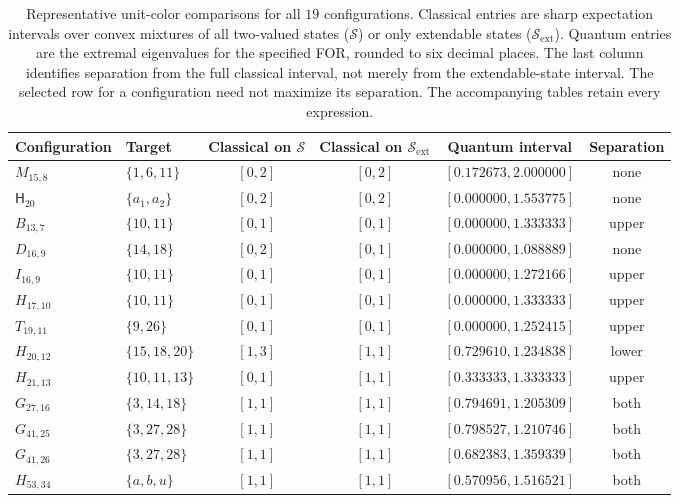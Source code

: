 \documentclass[aps,pra,reprint,superscriptaddress,longbibliography,nofootinbib,floatfix,10pt]{revtex4-2}
\theoremstyle{definition}\newtheorem{definition}[theorem]{Definition}
\theoremstyle{remark}\newtheorem{remark}[theorem]{Remark}
\newcommand{\Sc}{\mathcal S}\newcommand{\Cc}{\mathcal C}\newcommand{\Wc}{\mathcal W}
\begin{document}
\begin{table}[t]
\caption{Representative unit-color comparisons for all $19$ configurations. Classical entries are sharp expectation intervals over convex mixtures of all two-valued states ($\Sc$) or only extendable states ($\Sc_{\mathrm{ext}}$). Quantum entries are the extremal eigenvalues for the specified FOR, rounded to six decimal places. The last column identifies separation from the full classical interval, not merely from the extendable-state interval. The selected row for a configuration need not maximize its separation. The accompanying tables retain every expression.}\label{tab:classical-quantum-representatives}
\footnotesize\renewcommand{\arraystretch}{1.35}\setlength{\tabcolsep}{5pt}
\begin{ruledtabular}
\begin{tabular}{llcccc}
Configuration & Target & Classical on $\Sc$ & Classical on $\Sc_{\mathrm{ext}}$ & Quantum interval & Separation\\\hline
$M_{15,8}$ & $\{1,6,11\}$ & $[0,2]$ & $[0,2]$ & $[0.172673,2.000000]$ & none\\
$\mathsf H_{20}$ & $\{a_1,a_2\}$ & $[0,2]$ & $[0,2]$ & $[0.000000,1.553775]$ & none\\
$B_{13,7}$ & $\{10,11\}$ & $[0,1]$ & $[0,1]$ & $[0.000000,1.333333]$ & upper\\
$D_{16,9}$ & $\{14,18\}$ & $[0,2]$ & $[0,1]$ & $[0.000000,1.088889]$ & none\\
$I_{16,9}$ & $\{10,11\}$ & $[0,1]$ & $[0,1]$ & $[0.000000,1.272166]$ & upper\\
$H_{17,10}$ & $\{10,11\}$ & $[0,1]$ & $[0,1]$ & $[0.000000,1.333333]$ & upper\\
$T_{19,11}$ & $\{9,26\}$ & $[0,1]$ & $[0,1]$ & $[0.000000,1.252415]$ & upper\\
$H_{20,12}$ & $\{15,18,20\}$ & $[1,3]$ & $[1,1]$ & $[0.729610,1.234838]$ & lower\\
$H_{21,13}$ & $\{10,11,13\}$ & $[0,1]$ & $[1,1]$ & $[0.333333,1.333333]$ & upper\\
$G_{27,16}$ & $\{3,14,18\}$ & $[1,1]$ & $[1,1]$ & $[0.794691,1.205309]$ & both\\
$G_{41,25}$ & $\{3,27,28\}$ & $[1,1]$ & $[1,1]$ & $[0.798527,1.210746]$ & both\\
$G_{41,26}$ & $\{3,27,28\}$ & $[1,1]$ & $[1,1]$ & $[0.682383,1.359339]$ & both\\
$H_{53,34}$ & $\{a,b,u\}$ & $[1,1]$ & $[1,1]$ & $[0.570956,1.516521]$ & both\\

\end{tabular}
\end{ruledtabular}
\end{table}
\end{document}
